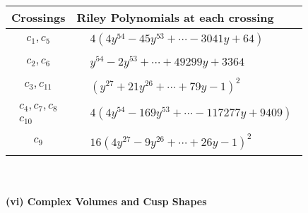 \documentclass[1p]{elsarticle_modified}
\theoremstyle{definition}
\begin{document}
\begin{tabular}{m{50pt}|m{274pt}}
Crossings & \hspace{64pt}Riley Polynomials at each crossing \\
\hline $$\begin{aligned}c_{1},c_{5}\end{aligned}$$&$\begin{aligned}
&4(4 y^{54}-45 y^{53}+\cdots-3041 y+64)
\end{aligned}$\\
\hline $$\begin{aligned}c_{2},c_{6}\end{aligned}$$&$\begin{aligned}
&y^{54}-2 y^{53}+\cdots+49299 y+3364
\end{aligned}$\\
\hline $$\begin{aligned}c_{3},c_{11}\end{aligned}$$&$\begin{aligned}
&(y^{27}+21 y^{26}+\cdots+79 y-1)^{2}
\end{aligned}$\\
\hline $$\begin{aligned}c_{4},c_{7},c_{8}\\c_{10}\end{aligned}$$&$\begin{aligned}
&4(4 y^{54}-169 y^{53}+\cdots-117277 y+9409)
\end{aligned}$\\
\hline $$\begin{aligned}c_{9}\end{aligned}$$&$\begin{aligned}
&16(4 y^{27}-9 y^{26}+\cdots+26 y-1)^{2}
\end{aligned}$\\
\hline
\end{tabular}\\~\\
\newpage\flushleft \textbf{(vi) Complex Volumes and Cusp Shapes}
\end{document}
